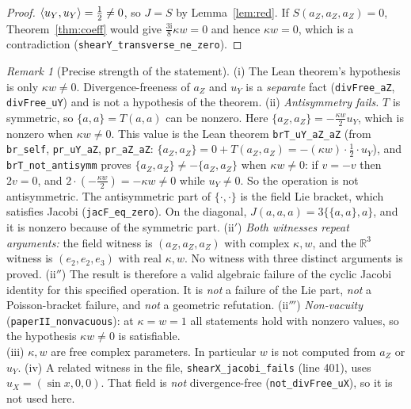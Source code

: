 \documentclass[11pt]{article}\emergencystretch=2em
\theoremstyle{definition}\newtheorem{definition}[theorem]{Definition}\theoremstyle{remark}\newtheorem{remark}[theorem]{Remark}
\newcommand{\ii}{\mathrm{i}}
\begin{document}
\begin{proof}
$\langle u_Y,u_Y\rangle=\tfrac12\ne0$, so $J=S$ by Lemma~\ref{lem:red}. If $S(a_Z,a_Z,a_Z)=0$, Theorem~\ref{thm:coeff} would give $\tfrac{3\ii}{8}\kappa w=0$ and hence $\kappa w=0$, which is a contradiction (\texttt{shearY\_transverse\_ne\_zero}).
\end{proof}
\begin{remark}[Precise strength of the statement]
(i) The Lean theorem's hypothesis is only $\kappa w\ne0$. Divergence-freeness of $a_Z$ and $u_Y$ is a \emph{separate} fact (\texttt{divFree\_aZ}, \texttt{divFree\_uY}) and is not a hypothesis of the theorem.
(ii) \emph{Antisymmetry fails.} $T$ is symmetric, so $\{a,a\}=T(a,a)$ can be nonzero. Here $\{a_Z,a_Z\}=-\tfrac{\kappa w}{2}u_Y$, which is nonzero when $\kappa w\ne0$. This value is the Lean theorem \texttt{brT\_uY\_aZ\_aZ} (from \texttt{br\_self}, \texttt{pr\_uY\_aZ}, \texttt{pr\_aZ\_aZ}: $\{a_Z,a_Z\}=0+T(a_Z,a_Z)=-(\kappa w)\cdot\tfrac12\cdot u_Y$), and \texttt{brT\_not\_antisymm} proves $\{a_Z,a_Z\}\ne-\{a_Z,a_Z\}$ when $\kappa w\ne0$: if $v=-v$ then $2v=0$, and $2\cdot(-\tfrac{\kappa w}{2})=-\kappa w\ne0$ while $u_Y\ne0$. So the operation is not antisymmetric. The antisymmetric part of $\{\cdot,\cdot\}$ is the field Lie bracket, which satisfies Jacobi (\texttt{jacF\_eq\_zero}). On the diagonal, $J(a,a,a)=3\{\{a,a\},a\}$, and it is nonzero because of the symmetric part.
(ii$'$) \emph{Both witnesses repeat arguments:} the field witness is $(a_Z,a_Z,a_Z)$ with complex $\kappa,w$, and the $\mathbb R^3$ witness is $(e_2,e_2,e_3)$ with real $\kappa,w$. No witness with three distinct arguments is proved.
(ii$''$) The result is therefore a valid algebraic failure of the cyclic Jacobi identity for this specified operation. It is \emph{not} a failure of the Lie part, \emph{not} a Poisson-bracket failure, and \emph{not} a geometric refutation.
(ii$'''$) \emph{Non-vacuity} (\texttt{paperII\_nonvacuous}): at $\kappa=w=1$ all statements hold with nonzero values, so the hypothesis $\kappa w\ne0$ is satisfiable.\\ (iii) $\kappa,w$ are free complex parameters. In particular $w$ is not computed from $a_Z$ or $u_Y$.
(iv) A related witness in the file, \texttt{shearX\_jacobi\_fails} (line 401), uses $u_X=(\sin x,0,0)$. That field is \emph{not} divergence-free (\texttt{not\_divFree\_uX}), so it is not used here.
\end{remark}
\end{document}

